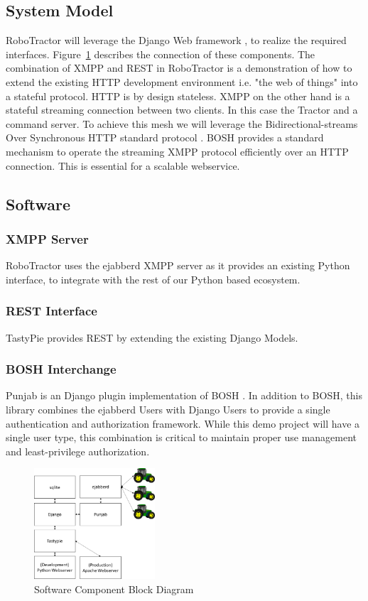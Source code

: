 \documentclass[conference,12pt]{IEEEtran}
\begin{document}
\subsection{System Model}
RoboTractor will leverage the Django Web framework \autocite{_django_2014}
, to realize the required
interfaces.  Figure~\ref{fig:softwarecomponents} describes the connection of
these components.  The combination of XMPP and REST in RoboTractor is
a demonstration of how to extend the existing HTTP development environment
i.e. "the web of things" into a stateful protocol. HTTP is by design
stateless. XMPP on the other hand is a stateful streaming connection between two
clients. In this case the Tractor and a command server.  To achieve this mesh we
will leverage the Bidirectional-streams Over Synchronous HTTP standard
protocol \autocite{paterson_bidirectional-streams_2010}. BOSH provides
a standard mechanism to operate the streaming XMPP protocol efficiently over an
HTTP connection. This is essential for a scalable webservice. 
\subsection{Software}
\subsubsection{XMPP Server}
RoboTractor uses the ejabberd \autocite{_ejabberd} XMPP server as it provides an existing Python
interface, to integrate with the rest of our Python based ecosystem.
\subsubsection{REST Interface}
TastyPie provides REST \autocite{_toastdriven/django-tastypie_2014} by extending
the existing Django Models.
\subsubsection{BOSH Interchange}
Punjab is an Django plugin implementation of BOSH
\autocite{_twonds/punjab_2014}.  In addition to BOSH, this library combines
the ejabberd Users with Django Users to provide a single authentication and
authorization framework. While this demo project will have a single user type,
this combination is critical to maintain proper use management and
least-privilege authorization.

\begin{figure}
\centering
\includegraphics[width=0.4\textwidth]{SoftwareComponentBlockDiagram.pdf}
\caption{Software Component Block Diagram}
\label{fig:softwarecomponents}
\end{figure}
\end{document}
